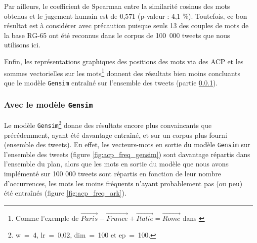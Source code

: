 \documentclass[11pt,french,french]{article}
\let\rmarkdownfootnote\footnote%
\def\footnote{\protect\rmarkdownfootnote}
\begin{document}
Par ailleurs, le coefficient de Spearman entre la similarité cosinus des mots obtenus et le jugement humain est de 0,571 (p-valeur : 4,1 \%). Toutefois, ce bon résultat est à considérer avec précaution puisque seuls 13 des couples de mots de la base RG-65 ont été reconnus dans le corpus de 100~000 tweets que nous utilisons ici.

Enfin, les représentations graphiques des positions des mots via des ACP et les sommes vectorielles sur les mots\footnote{Comme l'exemple de \(\overrightarrow{Paris} - \overrightarrow{France} + \overrightarrow{Italie} = \overrightarrow{Rome}\) dans \cite{Mikolov}} donnent des résultats bien moins concluants que le modèle \texttt{Gensim} entraîné sur l'ensemble des tweets (partie \ref{sec:gensimresultats}).

\hypertarget{sec:gensimresultats}{%
\subsubsection{\texorpdfstring{Avec le modèle \texttt{Gensim}}{Avec le modèle Gensim}}\label{sec:gensimresultats}}

Le modèle \texttt{Gensim}\footnote{w~=~4, lr~=~0,02, dim~=~100 et ep~=~100.} donne des résultats encore plus convaincants que précédemment, ayant été davantage entraîné, et sur un corpus plus fourni (ensemble des tweets).
En effet, les vecteurs-mots en sortie du modèle \texttt{Gensim} sur l'ensemble des tweets (figure \ref{fig:acp_freq_gensim}) sont davantage répartis dans l'ensemble du plan, alors que les mots en sortie du modèle que nous avons implémenté sur 100 000 tweets sont répartis en fonction de leur nombre d'occurrences, les mots les moins fréquents n'ayant probablement pas (ou peu) été entraînés (figure \ref{fig:acp_freq_ark}).
\end{document}
